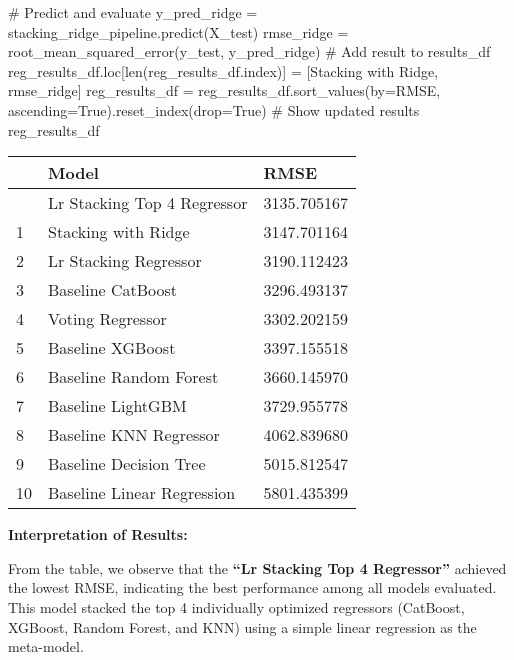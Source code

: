 \documentclass[
  letterpaper,
  DIV=11,
  numbers=noendperiod]{scrreprt}
\newenvironment{Shaded}{\begin{snugshade}}{\end{snugshade}}
\newcommand{\BuiltInTok}[1]{\textcolor[rgb]{0.00,0.23,0.31}{#1}}
\newcommand{\CommentTok}[1]{\textcolor[rgb]{0.37,0.37,0.37}{#1}}
\newcommand{\NormalTok}[1]{\textcolor[rgb]{0.00,0.23,0.31}{#1}}
\newcommand{\OperatorTok}[1]{\textcolor[rgb]{0.37,0.37,0.37}{#1}}
\newcommand{\StringTok}[1]{\textcolor[rgb]{0.13,0.47,0.30}{#1}}
\newcommand{\VariableTok}[1]{\textcolor[rgb]{0.07,0.07,0.07}{#1}}
\begin{document}
\begin{Shaded}
\begin{Highlighting}[]
\CommentTok{\# Predict and evaluate}
\NormalTok{y\_pred\_ridge }\OperatorTok{=}\NormalTok{ stacking\_ridge\_pipeline.predict(X\_test)}
\NormalTok{rmse\_ridge }\OperatorTok{=}\NormalTok{ root\_mean\_squared\_error(y\_test, y\_pred\_ridge)}
\CommentTok{\# Add result to results\_df}
\NormalTok{reg\_results\_df.loc[}\BuiltInTok{len}\NormalTok{(reg\_results\_df.index)] }\OperatorTok{=}\NormalTok{ [}\StringTok{\textquotesingle{}Stacking with Ridge\textquotesingle{}}\NormalTok{, rmse\_ridge]}
\NormalTok{reg\_results\_df }\OperatorTok{=}\NormalTok{ reg\_results\_df.sort\_values(by}\OperatorTok{=}\StringTok{\textquotesingle{}RMSE\textquotesingle{}}\NormalTok{, ascending}\OperatorTok{=}\VariableTok{True}\NormalTok{).reset\_index(drop}\OperatorTok{=}\VariableTok{True}\NormalTok{)}
\CommentTok{\# Show updated results}
\NormalTok{reg\_results\_df}
\end{Highlighting}
\end{Shaded}

\begin{longtable}[]{@{}lll@{}}
\toprule\noalign{}
& Model & RMSE \\
\midrule\noalign{}
\endhead
\bottomrule\noalign{}
\endlastfoot
0 & Lr Stacking Top 4 Regressor & 3135.705167 \\
1 & Stacking with Ridge & 3147.701164 \\
2 & Lr Stacking Regressor & 3190.112423 \\
3 & Baseline CatBoost & 3296.493137 \\
4 & Voting Regressor & 3302.202159 \\
5 & Baseline XGBoost & 3397.155518 \\
6 & Baseline Random Forest & 3660.145970 \\
7 & Baseline LightGBM & 3729.955778 \\
8 & Baseline KNN Regressor & 4062.839680 \\
9 & Baseline Decision Tree & 5015.812547 \\
10 & Baseline Linear Regression & 5801.435399 \\
\end{longtable}

\textbf{Interpretation of Results:}

From the table, we observe that the \textbf{``Lr Stacking Top 4
Regressor''} achieved the lowest RMSE, indicating the best performance
among all models evaluated. This model stacked the top 4 individually
optimized regressors (CatBoost, XGBoost, Random Forest, and KNN) using a
simple linear regression as the meta-model.
\end{document}
